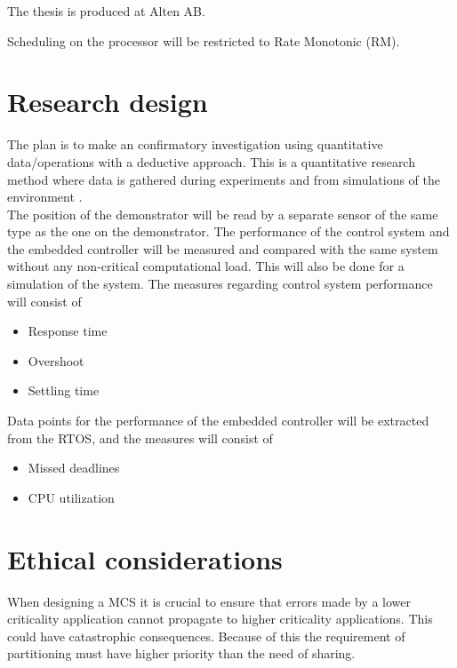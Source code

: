The thesis is produced at Alten AB. %


Scheduling on the processor will be restricted to Rate Monotonic (RM).

\section{Research design}
\label{sec:research}
The plan is to make an confirmatory investigation using quantitative data/operations with a deductive approach. This is a quantitative research method where data is gathered during experiments and from simulations of the environment \cite{hakansson2013}. \\ %

The position of the demonstrator will be read by a separate sensor of the same type as the one on the demonstrator. The performance of the control system and the embedded controller will be measured and compared with the same system without any non-critical computational load. This will also be done for a simulation of the system. The measures regarding control system performance will consist of 
\begin{itemize}
\item Response time
\item Overshoot
\item Settling time %
\end{itemize}

Data points for the performance of the embedded controller will be extracted from the RTOS, and the measures will consist of
\begin{itemize}
\item Missed deadlines
\item CPU utilization
\end{itemize}

\section{Ethical considerations}
When designing a MCS it is crucial to ensure that errors made by a lower criticality application cannot propagate to higher criticality applications. This could have catastrophic consequences. Because of this the requirement of partitioning must have higher priority than the need of sharing.
